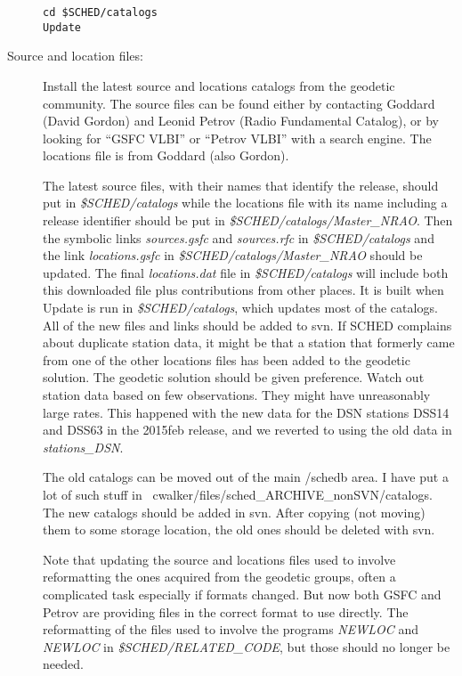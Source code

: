 \documentclass{report}
\begin{document}
\begin{description}
\begin{verbatim}
cd $SCHED/catalogs
Update
\end{verbatim}


\item [Source and location files:]

Install the latest source and locations catalogs from the geodetic
community.  The source files can be found either by contacting Goddard
(David Gordon) and Leonid Petrov (Radio Fundamental Catalog), or by
looking for ``GSFC VLBI'' or ``Petrov VLBI'' with a search engine.
The locations file is from Goddard (also Gordon).

The latest source files, with their names that identify the release,
should put in {\sl \$SCHED/catalogs} while the locations file with its
name including a release identifier should be put in {\sl
\$SCHED/catalogs/Master\_NRAO}.  Then the symbolic links {\sl
sources.gsfc} and {\sl sources.rfc} in {\sl \$SCHED/catalogs} and the
link {\sl locations.gsfc} in {\sl \$SCHED/catalogs/Master\_NRAO}
should be updated.  The final {\sl locations.dat} file in {\sl
\$SCHED/catalogs} will include both this downloaded file plus
contributions from other places.  It is built when Update is run in
{\sl \$SCHED/catalogs}, which updates most of the catalogs.  All of
the new files and links should be added to svn.  If SCHED complains
about duplicate station data, it might be that a station that formerly
came from one of the other locations files has been added to the
geodetic solution.  The geodetic solution should be given preference.
Watch out station data based on few observations.  They might have
unreasonably large rates.  This happened with the new data for the DSN
stations DSS14 and DSS63 in the 2015feb release, and we reverted to
using the old data in {\sl stations_DSN}.

The old catalogs can be moved out of the main /schedb area.  I have
put a lot of such stuff in
~cwalker/files/sched\_ARCHIVE\_nonSVN/catalogs.  The new catalogs
should be added in svn.  After copying (not moving) them to some
storage location, the old ones should be deleted with svn.

Note that updating the source and locations files used to involve
reformatting the ones acquired from the geodetic groups, often a
complicated task especially if formats changed.  But now both GSFC and
Petrov are providing files in the correct format to use directly.  The
reformatting of the files used to involve the programs {\sl NEWLOC}
and {\sl NEWLOC} in {\sl \$SCHED/RELATED\_CODE}, but those should no
longer be needed.



\end{description}
\end{document}
